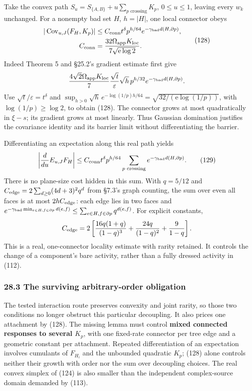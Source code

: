 \documentclass[11pt,a4paper]{article}
\begin{document}
Take the convex path \(S_u=S_{\{A,B\}}+u\sum_{p\text{ crossing}}K_p\),
\(0\le u\le1\), leaving every \(w_k\) unchanged. For a nonempty bad set
\(H\), \(h=|H|\), one local connector obeys \[\begin{aligned}
|\operatorname{Cov}_{u,J}(F_H,K_p)|
&\le C_{\rm conn}t^\delta p^{h/64}
                 e^{-\gamma_{\rm bad}d(H,\partial p)},\\
C_{\rm conn}&=\frac{32\Omega_{\rm app}K_{\rm loc}}
                         {7\sqrt{\mathrm e\log2}}.
\end{aligned}\tag{128}\] Indeed Theorem 5 and §25.2's gradient estimate
first give \[\frac{4\sqrt2\Omega_{\rm app}K_{\rm loc}}7
 \frac{\sqrt t}{\varepsilon}\sqrt h\,p^{h/32}
 e^{-\gamma_{\rm bad}d(H,\partial p)}.\] Use
\(\sqrt t/\varepsilon=t^\delta\) and
\(\sup_{h>0}\sqrt h\,e^{-\log(1/p)h/64} =\sqrt{32/(\mathrm e\log(1/p))}\),
with \(\log(1/p)\ge\log2\), to obtain (128). The connector grows at most
quadratically in \(\xi-s\); its gradient grows at most linearly. Thus
Gaussian domination justifies the covariance identity and its barrier
limit without differentiating the barrier.

Differentiating an expectation along this real path yields
\[\left|\frac d{du}E_{u,J}F_H\right|
\le C_{\rm conn}t^\delta p^{h/64}
 \sum_{p\text{ crossing}}e^{-\gamma_{\rm bad}d(H,\partial p)}.
\tag{129}\] There is no plane-size cost hidden in this sum. With
\(q=5/12\) and \(C_{\rm edge}=2\sum_{d\ge0}(4d+3)^2q^d\) from §7.3's
graph counting, the sum over even all faces is at most
\(2hC_{\rm edge}\): each edge lies in two faces and
\(e^{-\gamma_{\rm bad}\min_{e\in H,f\in\partial p}d(e,f)} \le\sum_{e\in H,f\in\partial p}q^{d(e,f)}\).
For explicit constants, \[C_{\rm edge}=2\left[
 \frac{16q(1+q)}{(1-q)^3}+\frac{24q}{(1-q)^2}+
 \frac9{1-q}\right].\] This is a real, one-connector locality estimate
with rarity retained. It controls the change of a component's bare
activity, rather than a fully dressed activity in (112).

\hypertarget{the-surviving-arbitrary-order-obligation}{%
\subsubsection{28.3 The surviving arbitrary-order
obligation}\label{the-surviving-arbitrary-order-obligation}}

The tested interaction route preserves convexity and joint rarity, so
those two conditions no longer obstruct this particular decoupling. It
also prices one attachment by (128). The missing lemma must control
\textbf{mixed connected responses to several \(K_p\)}, with one
fixed-rate connector per tree edge and a geometric constant per
attachment. Repeated differentiation of an expectation involves
cumulants of \(F_{H_i}\) and the unbounded quadratic \(K_p\); (128)
alone controls neither their growth with order nor the sum over
decoupling choices. The real convex simplex of (124) is also smaller
than the independent complex-source domain demanded by (113).
\end{document}
